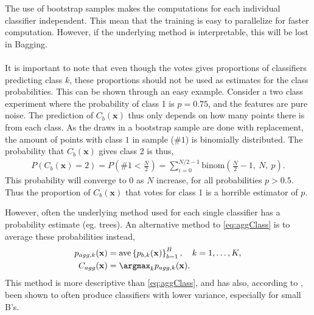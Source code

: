 The use of bootstrap samples makes the computations for each individual classifier independent. This mean that the training is easy to parallelize for faster computation. However, if the underlying method is interpretable, this will be lost in Bagging.
\\
\\
It is important to note that even though the votes gives proportions of classifiers predicting class $k$, these proportions should not be used as estimates for the class probabilities. This can be shown through an easy example. Consider a two class experiment where the probability of class 1 is $p = 0.75$, and the features are pure noise. The prediction of $C_b(\mathbf{x})$ thus only depends on how many points there is from each class. As the draws in a bootstrap sample are done with replacement, the amount of points with class $1$ in sample ($\# 1$) is binomially distributed. The probability that $C_b(\mathbf{x})$ gives class 2 is thus, 
\begin{align}
  P(C_b(\mathbf{x})=2) = P\left(\#1 <  \frac{N}{2} \right) = \sum_{i = 0}^{N/2 - 1} \mathrm{binom}\left(\frac{N}{2}-1,\: N,\: p  \right).
\end{align}
This probability will converge to 0 as $N$ increase, for all probabilities $p > 0.5$. Thus the proportion of $C_b(\mathbf{x})$ that votes for class 1 is a horrible estimator of $p$.

However, often the underlying method used for each single classifier has a probability estimate (eg. trees). An alternative method to \eqref{eq:aggClass} is to average these probabilities instead,
\begin{align}
  p_{agg, k}(\mathbf{x}) &=  \mathrm{ave}\left\{ p_{b, k}(\mathbf{x}) \right\}_{b = 1}^{B}, \quad k = 1, \ldots, K, \\
  \label{eq:aggClassP} 
  C_{agg}(\mathbf{x}) &= \argmax_k p_{agg, k}(\mathbf{x}).
\end{align}
This method is more descriptive than \eqref{eq:aggClass}, and has also, according to \cite{modstat}, been shown to often produce classifiers with lower variance, especially for small B's.

